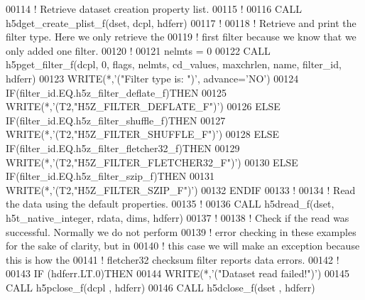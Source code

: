 \begin{DoxyCode}
00114   \textcolor{comment}{! Retrieve dataset creation property list.}
00115   \textcolor{comment}{!}
00116   \textcolor{keyword}{CALL }h5dget\_create\_plist\_f(dset, dcpl, hdferr)
00117   \textcolor{comment}{!}
00118   \textcolor{comment}{! Retrieve and print the filter type.  Here we only retrieve the}
00119   \textcolor{comment}{! first filter because we know that we only added one filter.}
00120   \textcolor{comment}{!}
00121   nelmts = 0
00122   \textcolor{keyword}{CALL }h5pget\_filter\_f(dcpl, 0, flags, nelmts, cd\_values, maxchrlen, name, filter\_id, hdferr)
00123   \textcolor{keyword}{WRITE}(*,\textcolor{stringliteral}{'("Filter type is: ")'}, advance=\textcolor{stringliteral}{'NO'})
00124   \textcolor{keywordflow}{IF}(filter\_id.EQ.h5z\_filter\_deflate\_f)\textcolor{keywordflow}{THEN}
00125      \textcolor{keyword}{WRITE}(*,\textcolor{stringliteral}{'(T2,"H5Z\_FILTER\_DEFLATE\_F")'})
00126   \textcolor{keywordflow}{ELSE} \textcolor{keywordflow}{IF}(filter\_id.EQ.h5z\_filter\_shuffle\_f)\textcolor{keywordflow}{THEN}
00127      \textcolor{keyword}{WRITE}(*,\textcolor{stringliteral}{'(T2,"H5Z\_FILTER\_SHUFFLE\_F")'})
00128   \textcolor{keywordflow}{ELSE} \textcolor{keywordflow}{IF}(filter\_id.EQ.h5z\_filter\_fletcher32\_f)\textcolor{keywordflow}{THEN}
00129      \textcolor{keyword}{WRITE}(*,\textcolor{stringliteral}{'(T2,"H5Z\_FILTER\_FLETCHER32\_F")'})
00130   \textcolor{keywordflow}{ELSE} \textcolor{keywordflow}{IF}(filter\_id.EQ.h5z\_filter\_szip\_f)\textcolor{keywordflow}{THEN}
00131      \textcolor{keyword}{WRITE}(*,\textcolor{stringliteral}{'(T2,"H5Z\_FILTER\_SZIP\_F")'})
00132 \textcolor{keywordflow}{  ENDIF}
00133   \textcolor{comment}{!}
00134   \textcolor{comment}{! Read the data using the default properties.}
00135   \textcolor{comment}{!}
00136   \textcolor{keyword}{CALL }h5dread\_f(dset, h5t\_native\_integer, rdata, dims, hdferr)
00137   \textcolor{comment}{!}
00138   \textcolor{comment}{! Check if the read was successful.  Normally we do not perform}
00139   \textcolor{comment}{! error checking in these examples for the sake of clarity, but in}
00140   \textcolor{comment}{! this case we will make an exception because this is how the}
00141   \textcolor{comment}{! fletcher32 checksum filter reports data errors.}
00142   \textcolor{comment}{!}
00143   \textcolor{keywordflow}{IF} (hdferr.LT.0)\textcolor{keywordflow}{THEN}
00144      \textcolor{keyword}{WRITE}(*,\textcolor{stringliteral}{'("Dataset read failed!")'})
00145      \textcolor{keyword}{CALL }h5pclose\_f(dcpl , hdferr)
00146      \textcolor{keyword}{CALL }h5dclose\_f(dset , hdferr)

\end{DoxyCode}
